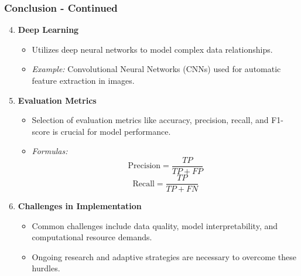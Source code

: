 \documentclass[aspectratio=169]{beamer}
\begin{document}
\begin{frame}[fragile]
    \frametitle{Conclusion - Continued}
    \begin{enumerate}
        \setcounter{enumi}{3}
        \item \textbf{Deep Learning}
        \begin{itemize}
            \item Utilizes deep neural networks to model complex data relationships.
            \item \textit{Example:} Convolutional Neural Networks (CNNs) used for automatic feature extraction in images.
        \end{itemize}
        
        \item \textbf{Evaluation Metrics}
        \begin{itemize}
            \item Selection of evaluation metrics like accuracy, precision, recall, and F1-score is crucial for model performance.
            \item \textit{Formulas:}
            \begin{equation}
                \text{Precision} = \frac{TP}{TP + FP}
            \end{equation}
            \begin{equation}
                \text{Recall} = \frac{TP}{TP + FN}
            \end{equation}
        \end{itemize}
        
        \item \textbf{Challenges in Implementation}
        \begin{itemize}
            \item Common challenges include data quality, model interpretability, and computational resource demands.
            \item Ongoing research and adaptive strategies are necessary to overcome these hurdles.
        \end{itemize}
    \end{enumerate}
\end{frame}
\end{document}
